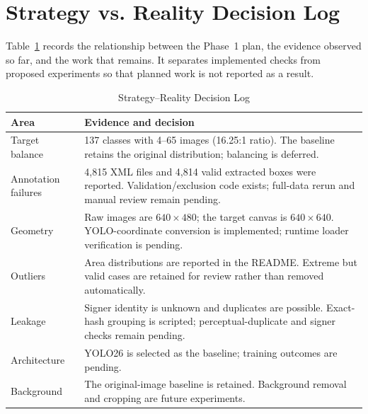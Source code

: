 \documentclass[conference]{IEEEtran}
\begin{document}
\section{Strategy vs. Reality Decision Log}
Table~\ref{tab:decision} records the relationship between the Phase~1 plan, the evidence observed so far, and the work that remains. It separates implemented checks from proposed experiments so that planned work is not reported as a result.
\begin{table}[!t]
\caption{Strategy--Reality Decision Log}
\label{tab:decision}
\centering
\scriptsize
\begin{tabular}{p{}p{}}
\toprule
Area & Evidence and decision \\
\midrule
Target balance & 137 classes with 4--65 images (16.25:1 ratio). The baseline retains the original distribution; balancing is deferred. \\
Annotation failures & 4,815 XML files and 4,814 valid extracted boxes were reported. Validation/exclusion code exists; full-data rerun and manual review remain pending. \\
Geometry & Raw images are $640\times480$; the target canvas is $640\times640$. YOLO-coordinate conversion is implemented; runtime loader verification is pending. \\
Outliers & Area distributions are reported in the README. Extreme but valid cases are retained for review rather than removed automatically. \\
Leakage & Signer identity is unknown and duplicates are possible. Exact-hash grouping is scripted; perceptual-duplicate and signer checks remain pending. \\
Architecture & YOLO26 is selected as the baseline; training outcomes are pending. \\
Background & The original-image baseline is retained. Background removal and cropping are future experiments. \\
\bottomrule
\end{tabular}
\end{table}
\FloatBarrier
\end{document}
